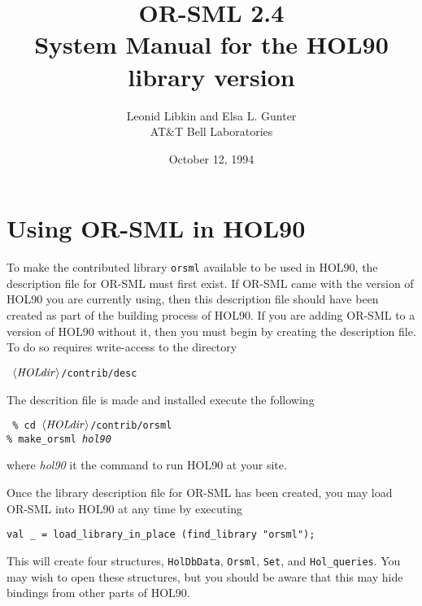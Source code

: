 
\parindent=0cm
\parskip=0.2cm
\setlength{\textwidth}{17cm}
\setlength{\oddsidemargin}{-0.24cm}
\setlength{\evensidemargin}{-0.24cm}
\setlength{\topmargin}{+0.0cm}
\setlength{\headheight}{0cm}
\setlength{\textheight}{22cm}
\setlength{\headsep}{0cm}


\sloppy

\pagestyle{plain}

\title{OR-SML 2.4\\ System Manual for the HOL90 library version }
\author{Leonid Libkin and Elsa L. Gunter\\ AT\&T Bell Laboratories}
\date{October 12, 1994}

\maketitle

\newcommand{\putit}[1]{\\ {\tt #1} \\}
\newcommand{\putin}[1]{\\ {\tt #1} \\}

\section{Using OR-SML in HOL90}

To make the contributed library {\tt orsml} available to be used in
HOL90, the description file for OR-SML must first exist.  If
OR-SML came with the version of HOL90 you are currently using, then
this description file should have been created as part of the building
process of HOL90.  If you are adding OR-SML to a version of HOL90
without it, then you must begin by creating the description file.  To
do so requires write-access to the directory
\begin{flushleft}\tt
$\langle{\it HOLdir\/}\rangle$/contrib/desc
\end{flushleft}
The descrition file is made and installed execute the following
\begin{flushleft}\tt
\% cd $\langle{\it HOLdir\/}\rangle$/contrib/orsml\\
\% make\_orsml {\it hol90}
\end{flushleft}
where {\it hol90\/} it the command to run HOL90 at your site.

Once the library description file for OR-SML has been created, you may
load OR-SML into HOL90 at any time by executing
\begin{verbatim}
val _ = load_library_in_place (find_library "orsml");
\end{verbatim}
This will create four structures, {\tt HolDbData}, {\tt Orsml},
{\tt Set}, and {\tt Hol\_queries}.  You may wish to open these
structures, but you should be aware that this may hide bindings from
other parts of HOL90.

